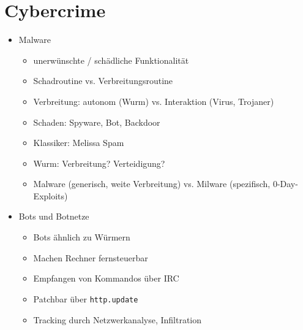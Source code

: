 \documentclass[11pt, paper=a4, twocolumn]{scrartcl}
\begin{document}
\section{Cybercrime}
	\begin{itemize}
		\item Malware
			\begin{itemize}
				\item unerwünschte / schädliche Funktionalität
				\item Schadroutine vs. Verbreitungsroutine
				\item Verbreitung: autonom (Wurm) vs. Interaktion (Virus, 
					Trojaner)
				\item Schaden: Spyware, Bot, Backdoor
				\item Klassiker: Melissa Spam
				\item Wurm: Verbreitung? Verteidigung?
				\item Malware (generisch, weite Verbreitung) vs. Milware 
					(spezifisch, 0-Day-Exploits)
			\end{itemize}

		\item Bots und Botnetze
			\begin{itemize}
				\item Bots ähnlich zu Würmern
				\item Machen Rechner fernsteuerbar
				\item Empfangen von Kommandos über IRC
				\item Patchbar über \texttt{http.update}
				\item Tracking durch Netzwerkanalyse, Infiltration
			\end{itemize}


\end{itemize}
\end{document}
